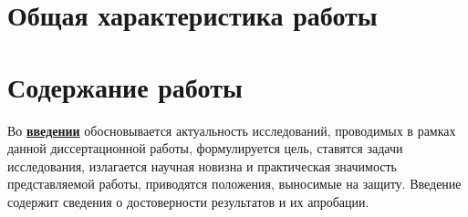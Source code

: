 \section*{Общая характеристика работы}

\newcommand{\actuality}{\pdfbookmark[1]{Актуальность и степень разработанности темы исследования}{actuality}\textbf{\uline{Актуальность и степень разработанности темы исследования.}}}
\newcommand{\progress}{\pdfbookmark[1]{Разработанность темы}{progress}\underline{\textbf{\progressTXT}}}
\newcommand{\aim}{\pdfbookmark[1]{Цели}{aim}\underline{{\textbf\aimTXT}}}
\newcommand{\tasks}{\pdfbookmark[1]{Задачи}{tasks}\underline{\textbf{\tasksTXT}}}
\newcommand{\aimtasks}{\pdfbookmark[1]{Цели и задачи}{aimtasks}\aimtasksTXT}
\newcommand{\novelty}{\pdfbookmark[1]{Научная новизна}{novelty}\underline{\textbf{\noveltyTXT}}}
\newcommand{\influence}{\pdfbookmark[1]{Практическая значимость}{influence}\underline{\textbf{\influenceTXT}}}
\newcommand{\methods}{\pdfbookmark[1]{Методология и методы исследования}{methods}\underline{\textbf{\methodsTXT}}}
\newcommand{\defpositions}{\pdfbookmark[1]{Положения, выносимые на защиту}{defpositions}\underline{\textbf{\defpositionsTXT}}}
\newcommand{\reliability}{\pdfbookmark[1]{Достоверность}{reliability}\underline{\textbf{\reliabilityTXT}}}
\newcommand{\probation}{\pdfbookmark[1]{Апробация}{probation}\underline{\textbf{\probationTXT}}}
\newcommand{\contribution}{\pdfbookmark[1]{Личный вклад}{contribution}\underline{\textbf{\contributionTXT}}}
\newcommand{\publications}{\pdfbookmark[1]{Публикации}{publications}\underline{\textbf{\publicationsTXT}}}




\section*{Содержание работы}
Во \underline{\textbf{введении}} обосновывается актуальность исследований, проводимых в рамках данной диссертационной работы, формулируется цель, ставятся задачи исследования, излагается научная новизна и практическая значимость представляемой работы, приводятся положения, выносимые на защиту. Введение содержит сведения о достоверности результатов и их апробации.

